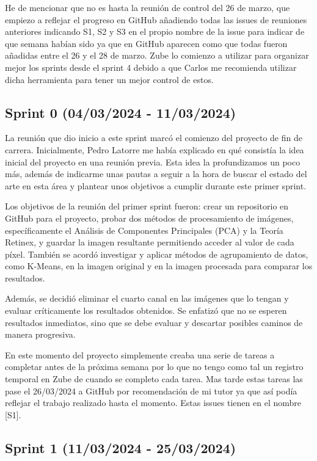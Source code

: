He de mencionar que no es hasta la reunión de control del 26 de marzo, que empiezo a reflejar el progreso en GitHub añadiendo todas las issues de reuniones anteriores indicando S1, S2 y S3 en el propio nombre de la issue para indicar de que semana habían sido ya que en GitHub aparecen como que todas fueron añadidas entre el 26 y el 28 de marzo. Zube lo comienzo a utilizar para organizar mejor los sprints desde el sprint 4 debido a que Carlos me recomienda utilizar dicha herramienta para tener un mejor control de estos.

\subsection{Sprint 0 (04/03/2024 - 11/03/2024)}\label{sprint-0}

La reunión que dio inicio a este sprint marcó el comienzo del proyecto de fin de carrera. Inicialmente, Pedro Latorre me había explicado en qué consistía la idea inicial del proyecto en una reunión previa. Esta idea la profundizamos un poco más, además de indicarme unas pautas a seguir a la hora de buscar el estado del arte en esta área y plantear unos objetivos a cumplir durante este primer sprint.

Los objetivos de la reunión del primer sprint fueron: crear un repositorio en GitHub para el proyecto, probar dos métodos de procesamiento de imágenes, específicamente el Análisis de Componentes Principales (PCA) y la Teoría Retinex, y guardar la imagen resultante permitiendo acceder al valor de cada píxel. También se acordó investigar y aplicar métodos de agrupamiento de datos, como K-Means, en la imagen original y en la imagen procesada para comparar los resultados. 

Además, se decidió eliminar el cuarto canal en las imágenes que lo tengan y evaluar críticamente los resultados obtenidos. Se enfatizó que no se esperen resultados inmediatos, sino que se debe evaluar y descartar posibles caminos de manera progresiva.

En este momento del proyecto simplemente creaba una serie de tareas a completar antes de la próxima semana por lo que no tengo como tal un registro temporal en Zube de cuando se completo cada tarea. Mas tarde estas tareas las pase el 26/03/2024 a GitHub por recomendación de mi tutor ya que así podía reflejar el trabajo realizado hasta el momento. Estas issues tienen en el nombre [S1].

\subsection{Sprint 1 (11/03/2024 - 25/03/2024)}\label{sprint-1}

